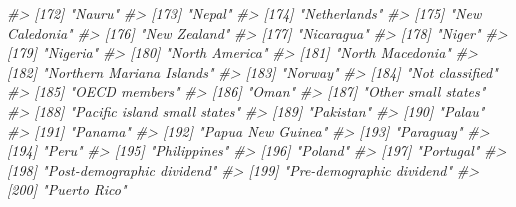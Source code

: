 \documentclass[
  xelatex, ja=standard]{bxjsbook}
\newenvironment{Shaded}{\begin{snugshade}}{\end{snugshade}}
\newcommand{\CommentTok}[1]{\textcolor[rgb]{0.56,0.35,0.01}{\textit{#1}}}
\theoremstyle{definition}
\theoremstyle{definition}
\theoremstyle{definition}
\theoremstyle{definition}
\theoremstyle{remark}
\begin{document}
\begin{Shaded}
\begin{Highlighting}[]
\CommentTok{\#\textgreater{} [172] "Nauru"                                               }
\CommentTok{\#\textgreater{} [173] "Nepal"                                               }
\CommentTok{\#\textgreater{} [174] "Netherlands"                                         }
\CommentTok{\#\textgreater{} [175] "New Caledonia"                                       }
\CommentTok{\#\textgreater{} [176] "New Zealand"                                         }
\CommentTok{\#\textgreater{} [177] "Nicaragua"                                           }
\CommentTok{\#\textgreater{} [178] "Niger"                                               }
\CommentTok{\#\textgreater{} [179] "Nigeria"                                             }
\CommentTok{\#\textgreater{} [180] "North America"                                       }
\CommentTok{\#\textgreater{} [181] "North Macedonia"                                     }
\CommentTok{\#\textgreater{} [182] "Northern Mariana Islands"                            }
\CommentTok{\#\textgreater{} [183] "Norway"                                              }
\CommentTok{\#\textgreater{} [184] "Not classified"                                      }
\CommentTok{\#\textgreater{} [185] "OECD members"                                        }
\CommentTok{\#\textgreater{} [186] "Oman"                                                }
\CommentTok{\#\textgreater{} [187] "Other small states"                                  }
\CommentTok{\#\textgreater{} [188] "Pacific island small states"                         }
\CommentTok{\#\textgreater{} [189] "Pakistan"                                            }
\CommentTok{\#\textgreater{} [190] "Palau"                                               }
\CommentTok{\#\textgreater{} [191] "Panama"                                              }
\CommentTok{\#\textgreater{} [192] "Papua New Guinea"                                    }
\CommentTok{\#\textgreater{} [193] "Paraguay"                                            }
\CommentTok{\#\textgreater{} [194] "Peru"                                                }
\CommentTok{\#\textgreater{} [195] "Philippines"                                         }
\CommentTok{\#\textgreater{} [196] "Poland"                                              }
\CommentTok{\#\textgreater{} [197] "Portugal"                                            }
\CommentTok{\#\textgreater{} [198] "Post{-}demographic dividend"                           }
\CommentTok{\#\textgreater{} [199] "Pre{-}demographic dividend"                            }
\CommentTok{\#\textgreater{} [200] "Puerto Rico"                                         }

\end{Highlighting}
\end{Shaded}
\end{document}
